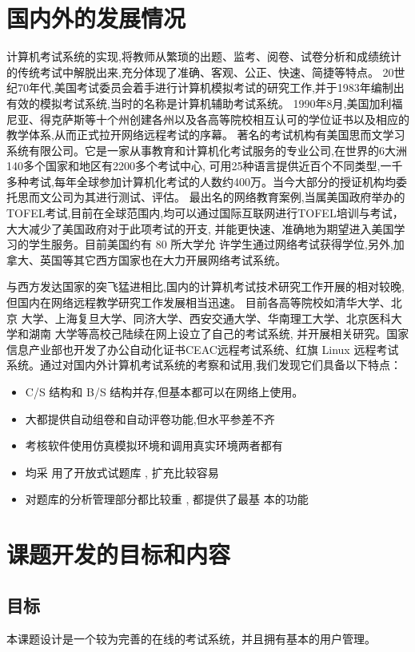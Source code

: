 \section{国内外的发展情况}
计算机考试系统的实现,将教师从繁琐的出题、监考、阅卷、试卷分析和成绩统计的传统考试中解脱出来,充分体现了准确、客观、公正、快速、简捷等特点。
20世纪70年代,美国考试委员会着手进行计算机模拟考试的研究工作,并于1983年编制出有效的模拟考试系统,当时的名称是计算机辅助考试系统。
1990年8月,美国加利福尼亚、得克萨斯等十个州创建各州以及各高等院校相互认可的学位证书以及相应的教学体系,从而正式拉开网络远程考试的序幕。
著名的考试机构有美国思而文学习系统有限公司。它是一家从事教育和计算机化考试服务的专业公司,在世界的6大洲140多个国家和地区有2200多个考试中心,
可用25种语言提供近百个不同类型,一千多种考试,每年全球参加计算机化考试的人数约400万。当今大部分的授证机构均委托思而文公司为其进行测试、评估。
最出名的网络教育案例,当属美国政府举办的TOFEL考试,目前在全球范围内,均可以通过国际互联网进行TOFEL培训与考试，大大减少了美国政府对于此项考试的开支,
并能更快速、准确地为期望进入美国学习的学生服务。目前美国约有 80 所大学允 许学生通过网络考试获得学位,另外,加拿大、英国等其它西方国家也在大力开展网络考试系统。
\par
与西方发达国家的突飞猛进相比,国内的计算机考试技术研究工作开展的相对较晚,但国内在网络远程教学研究工作发展相当迅速。
目前各高等院校如清华大学、北京 大学、上海复旦大学、同济大学、西安交通大学、华南理工大学、北京医科大学和湖南 大学等高校己陆续在网上设立了自己的考试系统,
并开展相关研究。国家信息产业部也开发了办公自动化证书CEAC远程考试系统、红旗 Linux 远程考试系统。通过对国内外计算机考试系统的考察和试用,我们发现它们具备以下特点：
\begin{itemize}
	\item C/S 结构和 B/S 结构并存,但基本都可以在网络上使用。
	\item 大都提供自动组卷和自动评卷功能,但水平参差不齐
	\item 考核软件使用仿真模拟环境和调用真实环境两者都有
	\item 均采 用了开放式试题库 , 扩充比较容易
	\item 对题库的分析管理部分都比较重 , 都提供了最基 本的功能
\end{itemize}
\section{课题开发的目标和内容}
\subsection{目标}
本课题设计是一个较为完善的在线的考试系统，并且拥有基本的用户管理。
